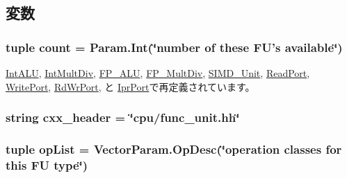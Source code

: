 \subsection{変数}
\hypertarget{classFuncUnit_1_1FUDesc_adf167b42e49fa9d4114bff901e1b1c29}{
\subsubsection[{count}]{\setlength{\rightskip}{0pt plus 5cm}tuple {\bf count} = Param.Int(\char`\"{}number of these FU's available\char`\"{})}}
\label{classFuncUnit_1_1FUDesc_adf167b42e49fa9d4114bff901e1b1c29}


\hyperlink{classFuncUnitConfig_1_1IntALU_ad43c3812e6d13e0518d9f8b8f463ffcf}{IntALU}, \hyperlink{classFuncUnitConfig_1_1IntMultDiv_ad43c3812e6d13e0518d9f8b8f463ffcf}{IntMultDiv}, \hyperlink{classFuncUnitConfig_1_1FP__ALU_ad43c3812e6d13e0518d9f8b8f463ffcf}{FP\_\-ALU}, \hyperlink{classFuncUnitConfig_1_1FP__MultDiv_ad43c3812e6d13e0518d9f8b8f463ffcf}{FP\_\-MultDiv}, \hyperlink{classFuncUnitConfig_1_1SIMD__Unit_ad43c3812e6d13e0518d9f8b8f463ffcf}{SIMD\_\-Unit}, \hyperlink{classFuncUnitConfig_1_1ReadPort_ad43c3812e6d13e0518d9f8b8f463ffcf}{ReadPort}, \hyperlink{classFuncUnitConfig_1_1WritePort_ad43c3812e6d13e0518d9f8b8f463ffcf}{WritePort}, \hyperlink{classFuncUnitConfig_1_1RdWrPort_ad43c3812e6d13e0518d9f8b8f463ffcf}{RdWrPort}, と \hyperlink{classFuncUnitConfig_1_1IprPort_ad43c3812e6d13e0518d9f8b8f463ffcf}{IprPort}で再定義されています。\hypertarget{classFuncUnit_1_1FUDesc_a17da7064bc5c518791f0c891eff05fda}{
\subsubsection[{cxx\_\-header}]{\setlength{\rightskip}{0pt plus 5cm}string {\bf cxx\_\-header} = \char`\"{}cpu/func\_\-unit.hh\char`\"{}}}
\label{classFuncUnit_1_1FUDesc_a17da7064bc5c518791f0c891eff05fda}
\hypertarget{classFuncUnit_1_1FUDesc_aa7a0c51c9e0149c27f9e38f86005dfbe}{
\subsubsection[{opList}]{\setlength{\rightskip}{0pt plus 5cm}tuple {\bf opList} = VectorParam.OpDesc(\char`\"{}operation classes for this FU {\bf type}\char`\"{})}}
\label{classFuncUnit_1_1FUDesc_aa7a0c51c9e0149c27f9e38f86005dfbe}


